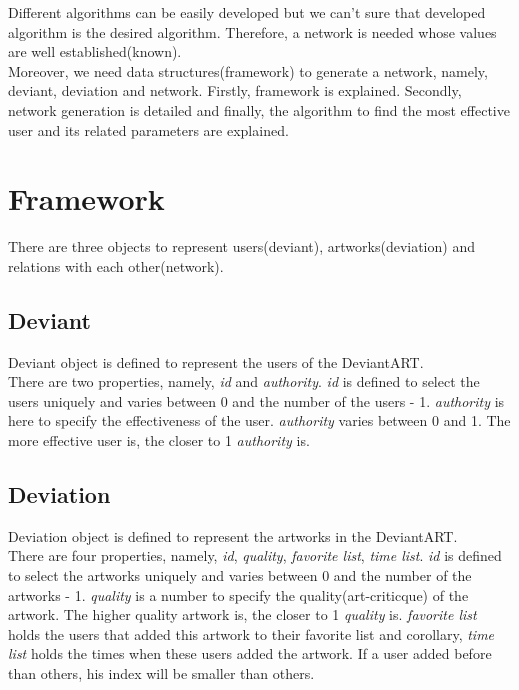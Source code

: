 \documentclass[12pt,a4paper]{report}
\begin{document}
	Different algorithms can be easily developed but we can't sure that developed algorithm is the desired algorithm. Therefore, a network is needed whose values are well established(known). \\

	Moreover, we need data structures(framework) to generate a network, namely, deviant, deviation and network. Firstly, framework is explained. Secondly, network generation is detailed and finally, the algorithm to find the most effective user and its related parameters are explained. 


\chapter{Framework} 

	There are three objects to represent users(deviant), artworks(deviation) and relations with each other(network). 

\section{Deviant}

	Deviant object is defined to represent the users of the DeviantART.  \\
	
	There are two properties, namely, \emph{id} and \emph{authority}. \emph{id} is defined to select the users uniquely and varies between 0 and the number of the users - 1. \emph{authority} is here to specify the effectiveness of the user. \emph{authority} varies between 0 and 1. The more effective user is, the closer to 1 \emph{authority} is. 	

\section{Deviation}

	Deviation object is defined to represent the artworks in the DeviantART. \\

	There are four properties, namely, \emph{id}, \emph{quality}, \emph{favorite list}, \emph{time list}. \emph{id} is defined to select the artworks uniquely and varies between 0 and the number of the artworks - 1. \emph{quality} is a number to specify the quality(art-criticque) of the artwork. The higher quality artwork is, the closer to 1 \emph{quality} is. \emph{favorite list} holds the users that added this artwork to their favorite list and corollary, \emph{time list} holds the times when these users added the artwork. If a user added before than others, his index will be smaller than others.
\end{document}
